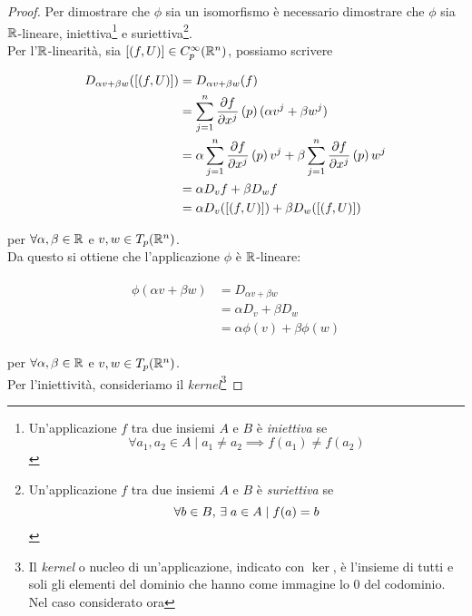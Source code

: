 \begin{proof}
	Per dimostrare che $ \phi $ sia un isomorfismo è necessario dimostrare che $ \phi $ sia $ \mathbb{R} $-lineare, iniettiva\footnote{%
		Un'applicazione $ f $ tra due insiemi $ A $ e $ B $ è \textit{iniettiva} se
		\begin{equation}
			\forall a_{1},a_{2} \in A \mid a_{1} \neq a_{2} \implies f(a_{1}) \neq f(a_{2})
		\end{equation}%
	} e suriettiva\footnote{%
		Un'applicazione $ f $ tra due insiemi $ A $ e $ B $ è \textit{suriettiva} se
		\begin{equation}
			\forall b \in B, \, \exists \; a \in A \mid f(a) = b
		\end{equation}%
	}.\\
	Per l'$ \mathbb{R} $-linearità, sia $ [(f,U)] \in C_{p}^{\infty}(\mathbb{R}^{n}) $, possiamo scrivere
	
	\begin{align}
		\begin{split}
			D_{\alpha v + \beta w} ([(f,U)]) &= D_{\alpha v + \beta w} (f)\\
			&= \sum_{j=1}^{n} \pdv{f}{x^{j}} \, (p) \, (\alpha v^{j} + \beta w^{j})\\
			&= \alpha \sum_{j=1}^{n} \pdv{f}{x^{j}} \, (p) \, v^{j} + \beta \sum_{j=1}^{n} \pdv{f}{x^{j}} \, (p) \, w^{j}\\
			&= \alpha D_{v} f + \beta D_{w} f\\
			&= \alpha D_{v} ([(f,U)]) + \beta D_{w} ([(f,U)])
		\end{split}
	\end{align}

	per $ \forall \alpha, \beta \in \mathbb{R} $ e $ v, w \in T_{p} (\mathbb{R}^{n}) $.\\
	Da questo si ottiene che l'applicazione $ \phi $ è $ \mathbb{R} $-lineare:
	
	\begin{align}
		\begin{split}
			\phi (\alpha v + \beta w) &= D_{\alpha v + \beta w}\\
			&= \alpha D_{v} + \beta D_{w}\\
			&= \alpha \phi (v) + \beta \phi (w)
		\end{split}
	\end{align}

	per $ \forall \alpha, \beta \in \mathbb{R} $ e $ v, w \in T_{p} (\mathbb{R}^{n}) $.\\
	Per l'iniettività, consideriamo il \textit{kernel}\footnote{%
	Il \textit{kernel} o nucleo di un'applicazione, indicato con $ \ker $, è l'insieme di tutti e soli gli elementi del dominio che hanno come immagine lo $ 0 $ del codominio. Nel caso considerato ora
	
}
\end{proof}
